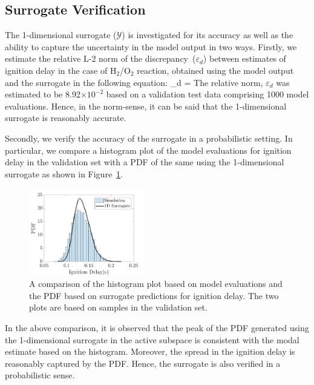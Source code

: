 \subsection{Surrogate Verification}
\label{sub:verify}

The 1-dimensional surrogate ($\mathcal{Y}$) is investigated for its accuracy as well as the ability to capture the 
uncertainty in the
model output in two ways. Firstly, we estimate the relative L-2 norm of the discrepancy~($\varepsilon_d$)
between estimates of ignition delay in the case of H$_2$/O$_2$ reaction, obtained using the 
model output and the surrogate in the following equation:
%
\be
\varepsilon_d = 
\ee
%
The relative norm, $\varepsilon_d$ was estimated to be 8.92$\times10^{-2}$ based on a validation test data
comprising 1000 model evaluations. Hence, in the norm-sense, it can be said that the 1-dimensional surrogate is 
reasonably accurate. 

Secondly, we verify the accuracy of the surrogate in a probabilistic setting. In particular, we compare a histogram
plot of the model evaluations for ignition delay in the validation set with a PDF of the same using the 1-dimensional
surrogate as shown in Figure~\ref{fig:pdf_33D}.
%
\begin{figure}[htbp]
 \begin{center}
  \includegraphics[width=0.45\textwidth]{./Figures/pdf_comp_id_1e4}
\caption{A comparison of the histogram plot based on model evaluations and the PDF based on surrogate
predictions for ignition delay. The two plots are based on samples in the validation set.}
\label{fig:pdf_33D}
\end{center}
\end{figure}
%
In the above comparison, it is observed that the peak of the PDF generated using the 1-dimensional surrogate in the
active subspace is consistent with the modal estimate based on the histogram. Moreover, the spread in the ignition
 delay is reasonably captured by the PDF. Hence, the surrogate is also verified in a probabilistic sense. 
 































